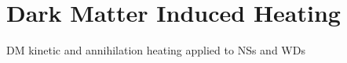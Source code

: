 \graphicspath{{img/chapter_5/}}

\chapter{Dark Matter Induced Heating }
\label{chapter:heating}

\begin{synopsis}
  DM kinetic and annihilation heating applied to NSs and WDs
\end{synopsis}
